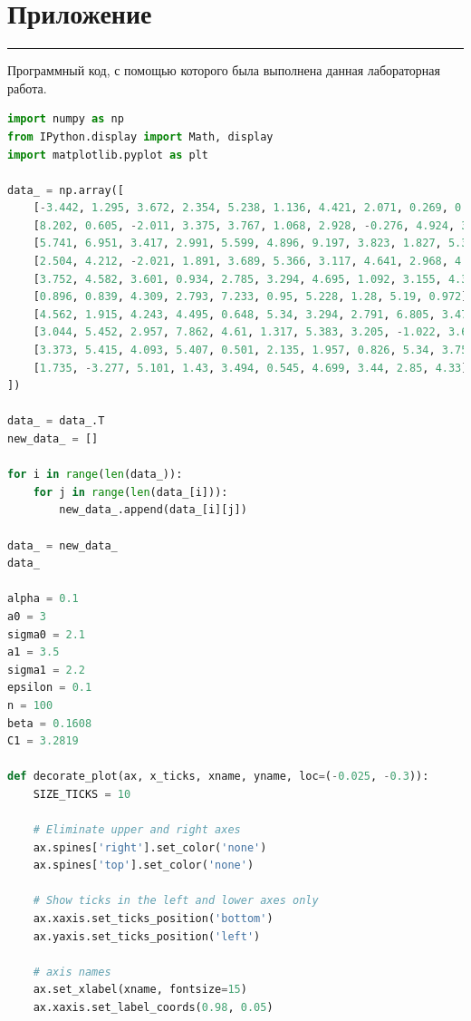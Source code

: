 \documentclass[a4paper, 14pt]{extarticle}
\begin{document}
\newpage

\section*{Приложение}\vspace{-20pt}\rule{\linewidth}{0.1mm}

Программный код, с помощью которого была выполнена данная лабораторная работа.\\

\begin{center}
  \begin{lstlisting}[language=Python]
import numpy as np
from IPython.display import Math, display
import matplotlib.pyplot as plt

data_ = np.array([
    [-3.442, 1.295, 3.672, 2.354, 5.238, 1.136, 4.421, 2.071, 0.269, 0.894],
    [8.202, 0.605, -2.011, 3.375, 3.767, 1.068, 2.928, -0.276, 4.924, 3.31],
    [5.741, 6.951, 3.417, 2.991, 5.599, 4.896, 9.197, 3.823, 1.827, 5.389],
    [2.504, 4.212, -2.021, 1.891, 3.689, 5.366, 3.117, 4.641, 2.968, 4.645],
    [3.752, 4.582, 3.601, 0.934, 2.785, 3.294, 4.695, 1.092, 3.155, 4.352],
    [0.896, 0.839, 4.309, 2.793, 7.233, 0.95, 5.228, 1.28, 5.19, 0.972],
    [4.562, 1.915, 4.243, 4.495, 0.648, 5.34, 3.294, 2.791, 6.805, 3.474],
    [3.044, 5.452, 2.957, 7.862, 4.61, 1.317, 5.383, 3.205, -1.022, 3.602],
    [3.373, 5.415, 4.093, 5.407, 0.501, 2.135, 1.957, 0.826, 5.34, 3.759],
    [1.735, -3.277, 5.101, 1.43, 3.494, 0.545, 4.699, 3.44, 2.85, 4.33]
])

data_ = data_.T
new_data_ = []

for i in range(len(data_)):
    for j in range(len(data_[i])):
        new_data_.append(data_[i][j])

data_ = new_data_
data_

alpha = 0.1
a0 = 3
sigma0 = 2.1
a1 = 3.5
sigma1 = 2.2
epsilon = 0.1
n = 100
beta = 0.1608
C1 = 3.2819

def decorate_plot(ax, x_ticks, xname, yname, loc=(-0.025, -0.3)):
    SIZE_TICKS = 10

    # Eliminate upper and right axes
    ax.spines['right'].set_color('none')
    ax.spines['top'].set_color('none')

    # Show ticks in the left and lower axes only
    ax.xaxis.set_ticks_position('bottom')
    ax.yaxis.set_ticks_position('left')

    # axis names
    ax.set_xlabel(xname, fontsize=15)
    ax.xaxis.set_label_coords(0.98, 0.05)


\end{lstlisting}
\end{center}
\end{document}
